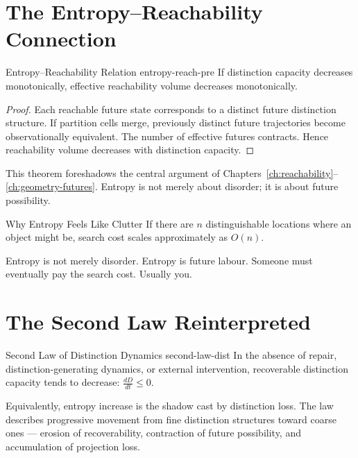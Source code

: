 \documentclass[12pt,twoside,openright]{book}
\begin{document}
\section{The Entropy--Reachability Connection}
\label{sec:ch3-reach}

\begin{theorem}{Entropy--Reachability Relation}%
  {entropy-reach-pre}
  If distinction capacity decreases monotonically,
  effective reachability volume decreases monotonically.
\end{theorem}

\begin{proof}
  Each reachable future state corresponds to a distinct
  future distinction structure. If partition cells merge,
  previously distinct future trajectories become
  observationally equivalent. The number of effective
  futures contracts. Hence reachability volume decreases
  with distinction capacity.
\end{proof}

This theorem foreshadows the central argument of
Chapters~\ref{ch:reachability}--\ref{ch:geometry-futures}.
Entropy is not merely about disorder; it is about future
possibility.

\begin{envelopeaside}{Why Entropy Feels Like Clutter}
If there are $n$ distinguishable locations where an object
might be, search cost scales approximately as $O(n)$.

Entropy is not merely disorder. Entropy is future labour.
Someone must eventually pay the search cost. Usually you.
\end{envelopeaside}

\section{The Second Law Reinterpreted}
\label{sec:ch3-second}

\begin{law}{Second Law of Distinction Dynamics}%
  {second-law-dist}
  In the absence of repair, distinction-generating
  dynamics, or external intervention, recoverable
  distinction capacity tends to decrease:
  $\frac{dD}{dt} \le 0$.
\end{law}

Equivalently, entropy increase is the shadow cast by
distinction loss. The law describes progressive movement
from fine distinction structures toward coarse ones —
erosion of recoverability, contraction of future
possibility, and accumulation of projection loss.
\end{document}

